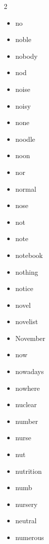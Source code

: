 \documentclass[../../book.tex]{subfiles}
\begin{document}
\begin{multicols}{2}
\begin{itemize}
\item[-] no
\item[-] noble
\item[-] nobody
\item[-] nod
\item[-] noise
\item[-] noisy
\item[-] none
\item[-] noodle
\item[-] noon
\item[-] nor
\item[-] normal
\item[-] nose
\item[-] not
\item[-] note
\item[-] notebook
\item[-] nothing
\item[-] notice
\item[-] novel
\item[-] novelist
\item[-] November
\item[-] now
\item[-] nowadays
\item[-] nowhere
\item[-] nuclear
\item[-] number
\item[-] nurse
\item[-] nut
\item[-] nutrition
\item[-] numb
\item[-] nursery
\item[-] neutral
\item[-] numerous
\end{itemize}
\end{multicols}
\end{document}
